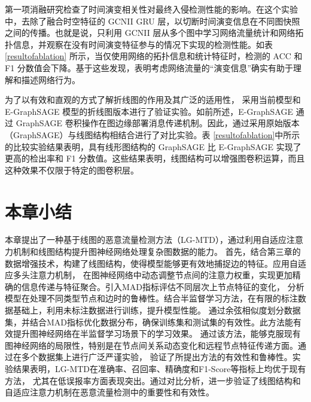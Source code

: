 \documentclass[promaster]{thesis-uestc}
\begin{document}
第一项消融研究检查了时间演变相关性对最终入侵检测性能的影响。在这个实验中，去除了融合时空特征的 GCNII GRU 层，以切断时间演变信息在不同图快照之间的传播。也就是说，只利用 GCNII 层从多个图中学习网络流量统计和网络拓扑信息，并观察在没有时间演变特征参与的情况下实现的检测性能。如表\ref{resultofablation} 所示，当仅使用网络的拓扑信息和统计特征时，检测的 ACC 和 F1 分数值会下降。基于这些发现，表明考虑网络流量的“演变信息”确实有助于理解和描述网络行为。

为了以有效和直观的方式了解折线图的作用及其广泛的适用性， 采用当前模型和E-GraphSAGE 模型的折线图版本进行了验证实验。如前所述，E-GraphSAGE 通过 GraphSAGE 卷积操作在图边缘部署消息传递机制。因此，通过采用原始版本（GraphSAGE）与线图结构相结合进行了对比实验。表 \ref{resultofablation}中所示的比较实验结果表明，具有线形图结构的 GraphSAGE 比 E-GraphSAGE 实现了更高的检出率和 F1 分数值。这些结果表明，线图结构可以增强图卷积运算，而且这种效果不仅限于特定的图卷积层。

\section{本章小结}
本章提出了一种基于线图的恶意流量检测方法（LG-MTD），通过利用自适应注意力机制和线图结构提升图神经网络处理复杂图数据的能力。
首先，结合第三章的数据增强技术，构建了线图结构，使得模型能够更有效地捕捉边的特征。应用自适应多头注意力机制，
在图神经网络中动态调整节点间的注意力权重，实现更加精确的信息传递与特征聚合。引入MAD指标评估不同层次上节点特征的变化，
分析模型在处理不同类型节点和边时的鲁棒性。结合半监督学习方法，在有限的标注数据基础上，利用未标注数据进行训练，提升模型性能。
通过余弦相似度划分数据集，并结合MAD指标优化数据分布，确保训练集和测试集的有效性。此方法能有效提升图神经网络在半监督学习场景下的学习效果。
通过该方法，能够克服现有图神经网络的局限性，特别是在节点间关系动态变化和远程节点特征传递方面。通过在多个数据集上进行广泛严谨实验，
验证了所提出方法的有效性和鲁棒性。实验结果表明，LG-MTD在准确率、召回率、精确度和F1-Score等指标上均优于现有方法，
尤其在低误报率方面表现突出。通过对比分析，进一步验证了线图结构和自适应注意力机制在恶意流量检测中的重要性和有效性。
\end{document}
